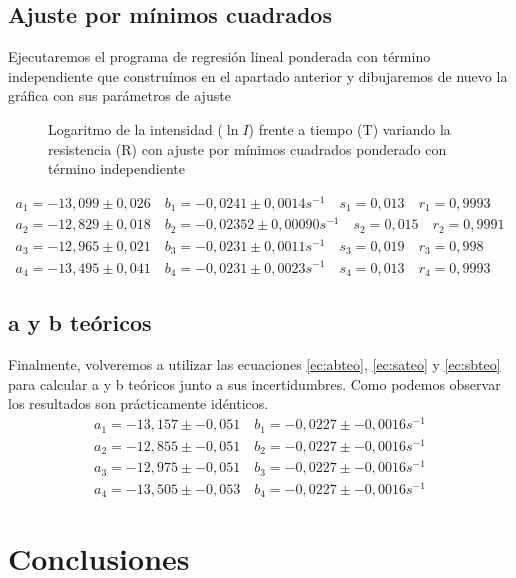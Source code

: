 \documentclass[12pt, a4paper, titlepage]{article}
\begin{document}
  \subsection{Ajuste por mínimos cuadrados}

  Ejecutaremos el programa de regresión lineal ponderada con término independiente que construímos en el apartado anterior y dibujaremos de nuevo la gráfica con sus parámetros de ajuste

  \begin{figure}[H]
    \hspace{1.8em} 
    \caption{Logaritmo de la intensidad ($\ln{I}$) frente a tiempo (T) variando la resistencia (R) con ajuste por mínimos cuadrados ponderado con término independiente}
  \end{figure}
  \begin{gather*}
    a_1 = -13,099 \pm 0,026 \quad b_1 = -0,0241 \pm 0,0014 s^{-1} \quad s_1 = 0,013 \quad r_1 = 0,9993 \\
    a_2 = -12,829 \pm 0,018 \quad b_2 = -0,02352 \pm 0,00090 s^{-1} \quad s_2 = 0,015 \quad r_2 = 0,9991 \\
    a_3 = -12,965 \pm 0,021 \quad b_3 = -0,0231 \pm 0,0011 s^{-1} \quad s_3 = 0,019 \quad r_3 = 0,998 \\
    a_4 = -13,495 \pm 0,041 \quad b_4 = -0,0231 \pm 0,0023 s^{-1} \quad s_4 = 0,013 \quad r_4 = 0,9993
  \end{gather*}

  \subsection{a y b teóricos}

  Finalmente, volveremos a utilizar las ecuaciones \ref{ec:abteo}, \ref{ec:sateo} y \ref{ec:sbteo} para calcular a y b teóricos junto a sus incertidumbres. Como podemos observar los resultados son prácticamente idénticos.
  \begin{gather*}
    a_1 = -13,157 \pm -0,051 \quad b_1 = -0,0227 \pm -0,0016 s^{-1} \\
    a_2 = -12,855 \pm -0,051 \quad b_2 = -0,0227 \pm -0,0016 s^{-1} \\
    a_3 = -12,975 \pm -0,051 \quad b_3 = -0,0227 \pm -0,0016 s^{-1} \\
    a_4 = -13,505 \pm -0,053 \quad b_4 = -0,0227 \pm -0,0016 s^{-1}
  \end{gather*}

  \newpage
  \section{Conclusiones}
\end{document}
